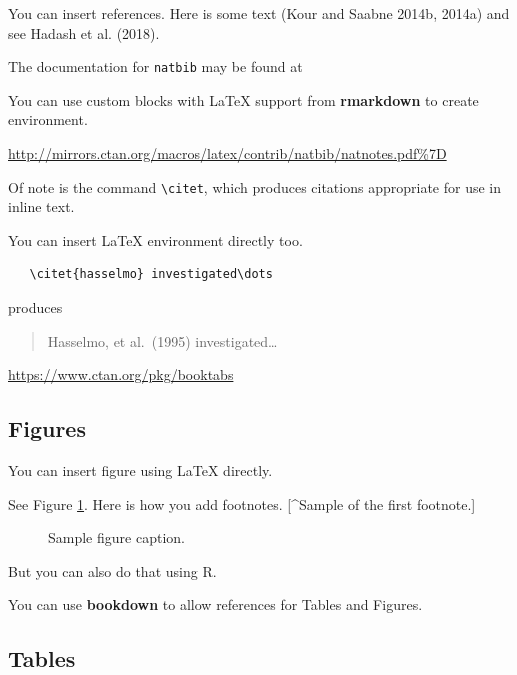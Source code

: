 \documentclass{article}
\begin{document}
\label{sec:others}

You can insert references. Here is some text (Kour and Saabne 2014b,
2014a) and see Hadash et al. (2018).

The documentation for \verb+natbib+ may be found at

You can use custom blocks with LaTeX support from \textbf{rmarkdown} to
create environment.

\begin{center}
\url{http://mirrors.ctan.org/macros/latex/contrib/natbib/natnotes.pdf\%7D}

\end{center}

Of note is the command \verb+\citet+, which produces citations
appropriate for use in inline text.

You can insert LaTeX environment directly too.

\begin{verbatim}
   \citet{hasselmo} investigated\dots
\end{verbatim}

produces

\begin{quote}
  Hasselmo, et al.\ (1995) investigated\dots
\end{quote}

\begin{center}
  \url{https://www.ctan.org/pkg/booktabs}
\end{center}

\subsection{Figures}\label{figures}

You can insert figure using LaTeX directly.

See Figure \ref{fig:fig1}. Here is how you add footnotes. {[}\^{}Sample
of the first footnote.{]}

\begin{figure}
  \centering
  \fbox{\rule[-.5cm]{4cm}{4cm} \rule[-.5cm]{4cm}{0cm}}
  \caption{Sample figure caption.}
  \label{fig:fig1}
\end{figure}

But you can also do that using R.

You can use \textbf{bookdown} to allow references for Tables and
Figures.

\subsection{Tables}\label{tables}
\end{document}
